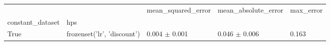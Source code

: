 \begin{tabular}{lllll}
\toprule
 &  & mean_squared_error & mean_absolute_error & max_error \\
constant_dataset & hps &  &  &  \\
\midrule
True & frozenset({'lr', 'discount'}) & 0.004 $\pm$ 0.001 & 0.046 $\pm$ 0.006 & 0.163 \\
\cline{1-5}
\bottomrule
\end{tabular}
